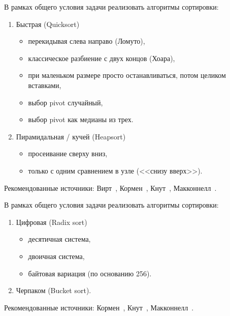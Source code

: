 \begin{zztask}
В рамках общего условия задачи реализовать алгоритмы сортировки:
\begin{enumerate}
\item Быстрая (Quicksort)
  \begin{itemize}[--]
  \item перекидывая слева направо (Ломуто),
  \item классическое разбиение с двух концов (Хоара),
  \item при маленьком размере просто останавливаться, потом целиком вставками,
  \item выбор pivot случайный,
  \item выбор pivot как медианы из трех.
  \end{itemize}
\item Пирамидальная / кучей (Heapsort)
  \begin{itemize}[--]
  \item просеивание сверху вниз,
  \item только с одним сравнением в узле (<<снизу вверх>>).
  \end{itemize}
\end{enumerate}
%
Рекомендованные источники:
Вирт~\cite[\S2.3.2--2.3.3]{wirth2016algoritmy},
Кормен~\cite[\S7.1--7.5, \S8.1--8.4]{kormen2016algoritmy},
Кнут~\cite[\S5.2.2--5.2.3]{knuth2014iskusstvo},
Макконнелл~\cite[\S3.5, \S3.7]{mcconnel2009analyz}.
\end{zztask}


\begin{zztask}[Линейные]
В рамках общего условия задачи реализовать алгоритмы сортировки:
\begin{enumerate}
\item Цифровая (Radix sort)
  \begin{itemize}[--]
  \item десятичная система,
  \item двоичная система,
  \item байтовая вариация (по основанию 256).
  \end{itemize}
\item Черпаком (Bucket sort).
\end{enumerate}
%
Рекомендованные источники:
Кормен~\cite[\S9.2--9.4]{kormen2016algoritmy},
Кнут~\cite[\S5.2.5]{knuth2014iskusstvo},
Макконнелл~\cite[\S3.4]{mcconnel2009analyz}.
\end{zztask}


